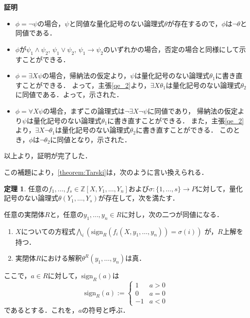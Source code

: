 \documentclass[uplatex, dvipdfmx]{jsarticle}
\makeatletter
\numberwithin{equation}{section}
\renewenvironment{proof}[1][\proofname]{\par
  \pushQED{\qed}%
  \normalfont \topsep6\p@\@plus6\p@\relax
  \trivlist
  \item\relax
  {\bfseries
  #1\@addpunct{.}}\hspace\labelsep\ignorespaces
}{
  \popQED\endtrivlist\@endpefalse
}
\newcommand{\Z}{\mathbb{Z}}
\newcommand{\sign}{\mathrm{sign}}
\newcommand{\map}[3]{{#1}\colon{#2}\rightarrow{#3}}
\theoremstyle{definition}
\newtheorem{theorem}[definition]{定理}
\renewcommand{\proofname}{\textbf{証明}}
\makeatother
\begin{document}
\begin{proof}
     \begin{itemize}
          \item $\phi = \lnot \psi$の場合，$\psi$と同値な量化記号のない論理式$\theta$が存在するので，$\phi$は$\lnot \theta$と同値である．
          \item $\phi$が$\psi_1 \land \psi_2$, $\psi_1 \lor \psi_2$, $\psi_1 \rightarrow \psi_2$のいずれかの場合，否定の場合と同様にして示すことができる．
          \item $\phi = \exists X \psi$の場合，帰納法の仮定より，$\psi$は量化記号のない論理式$\theta_1$に書き直すことができる．
          よって，主張\ref{qe_2}より，$\exists X \theta_1$は量化記号のない論理式$\theta_2$に同値である．よって，示された．
          \item $\phi = \forall X \psi$の場合，まずこの論理式は$\lnot \exists X \lnot \psi$に同値であり，
          帰納法の仮定より$\psi$は量化記号のない論理式$\theta_1$に書き直すことができる．
          また，主張\ref{qe_2}より，$\exists X \lnot \theta_1$は量化記号のない論理式$\theta_2$に書き直すことができる．
          このとき，$\phi$は$\lnot \theta_2$に同値となり，示された．
     \end{itemize}     

     以上より，証明が完了した．
\end{proof}

この補題により，\cref{theorem:Tarski}は，次のように言い換えられる．

\begin{theorem}\label{theorem:weak_Tarski}
     任意の$f_1, \dots, f_s \in \Z[X,Y_1, \dots, Y_n]$および$\map{\sigma}{\{1, \dots, s\}}{P}$に対して，量化記号のない論理式$\theta(Y_1, \dots, Y_s)$が存在して，次を満たす．

     任意の実閉体$R$と，任意の$y_1, \dots, y_n \in R$に対し，次の二つが同値になる．
     \begin{enumerate}
          \item $X$についての方程式$\bigwedge_i (\sign_R(f_i(X,y_1, \dots, y_n)) = \sigma(i))$ が，$R$上解を持つ．
          \item 実閉体$R$における解釈$\theta^R(y_1, \dots, y_n)$は真．
     \end{enumerate}
\end{theorem}

ここで，$a \in R$に対して，$\sign_R(a)$は
\begin{equation}
     \sign_R(a) :=
     \begin{cases}
          1 & a > 0 \\
          0 & a = 0 \\
          -1 & a < 0
     \end{cases}
\end{equation}
であるとする．これを，$a$の符号と呼ぶ．
\end{document}
